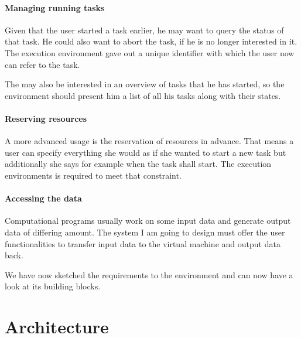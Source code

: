 \paragraph{Managing running tasks}

Given  that the user  started a  task earlier,  he may  want to  query the
status of  that task. He could  also want to abort  the task, if  he is no
longer  interested in  it. The  execution  environment gave  out a  unique
identifier with which the user now can refer to the task.

The may also be interested in an overview of tasks that he has started, so
the environment  should present  him a  list of all  his tasks  along with
their states.

\paragraph{Reserving resources}

A more  advanced usage  is the reservation  of resources in  advance. That
means a user can specify everything she  would as if she wanted to start a
new task but additionally she says  for example when the task shall start. 
The execution environments is required to meet that constraint.

\paragraph{Accessing the data}

Computational programs usually work on some input data and generate output
data of differing  amount. The system I am going to  design must offer the
user functionalities  to transfer  input data to  the virtual  machine and
output data back.

\bigskip

We have now sketched the requirements  to the environment and can now have
a look at its building blocks.

\section{Architecture}
\label{sec:architecture}

